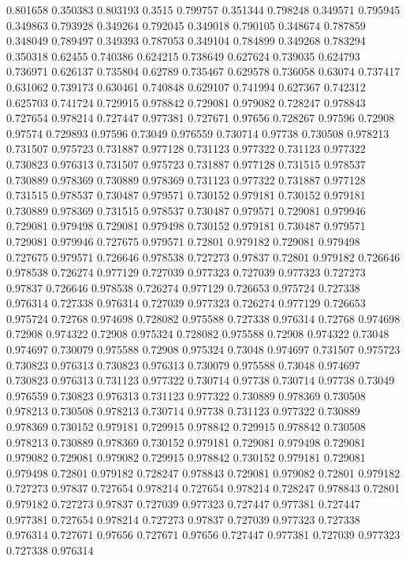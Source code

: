 0.801658 0.350383
0.803193 0.3515
0.799757 0.351344
0.798248 0.349571
0.795945 0.349863
0.793928 0.349264
0.792045 0.349018
0.790105 0.348674
0.787859 0.348049
0.789497 0.349393
0.787053 0.349104
0.784899 0.349268
0.783294 0.350318
0.62455 0.740386
0.624215 0.738649
0.627624 0.739035
0.624793 0.736971
0.626137 0.735804
0.62789 0.735467
0.629578 0.736058
0.63074 0.737417
0.631062 0.739173
0.630461 0.740848
0.629107 0.741994
0.627367 0.742312
0.625703 0.741724
0.729915 0.978842
0.729081 0.979082
0.728247 0.978843
0.727654 0.978214
0.727447 0.977381
0.727671 0.97656
0.728267 0.97596
0.72908 0.97574
0.729893 0.97596
0.73049 0.976559
0.730714 0.97738
0.730508 0.978213
0.731507 0.975723
0.731887 0.977128
0.731123 0.977322
0.731123 0.977322
0.730823 0.976313
0.731507 0.975723
0.731887 0.977128
0.731515 0.978537
0.730889 0.978369
0.730889 0.978369
0.731123 0.977322
0.731887 0.977128
0.731515 0.978537
0.730487 0.979571
0.730152 0.979181
0.730152 0.979181
0.730889 0.978369
0.731515 0.978537
0.730487 0.979571
0.729081 0.979946
0.729081 0.979498
0.729081 0.979498
0.730152 0.979181
0.730487 0.979571
0.729081 0.979946
0.727675 0.979571
0.72801 0.979182
0.729081 0.979498
0.727675 0.979571
0.726646 0.978538
0.727273 0.97837
0.72801 0.979182
0.726646 0.978538
0.726274 0.977129
0.727039 0.977323
0.727039 0.977323
0.727273 0.97837
0.726646 0.978538
0.726274 0.977129
0.726653 0.975724
0.727338 0.976314
0.727338 0.976314
0.727039 0.977323
0.726274 0.977129
0.726653 0.975724
0.72768 0.974698
0.728082 0.975588
0.727338 0.976314
0.72768 0.974698
0.72908 0.974322
0.72908 0.975324
0.728082 0.975588
0.72908 0.974322
0.73048 0.974697
0.730079 0.975588
0.72908 0.975324
0.73048 0.974697
0.731507 0.975723
0.730823 0.976313
0.730823 0.976313
0.730079 0.975588
0.73048 0.974697
0.730823 0.976313
0.731123 0.977322
0.730714 0.97738
0.730714 0.97738
0.73049 0.976559
0.730823 0.976313
0.731123 0.977322
0.730889 0.978369
0.730508 0.978213
0.730508 0.978213
0.730714 0.97738
0.731123 0.977322
0.730889 0.978369
0.730152 0.979181
0.729915 0.978842
0.729915 0.978842
0.730508 0.978213
0.730889 0.978369
0.730152 0.979181
0.729081 0.979498
0.729081 0.979082
0.729081 0.979082
0.729915 0.978842
0.730152 0.979181
0.729081 0.979498
0.72801 0.979182
0.728247 0.978843
0.729081 0.979082
0.72801 0.979182
0.727273 0.97837
0.727654 0.978214
0.727654 0.978214
0.728247 0.978843
0.72801 0.979182
0.727273 0.97837
0.727039 0.977323
0.727447 0.977381
0.727447 0.977381
0.727654 0.978214
0.727273 0.97837
0.727039 0.977323
0.727338 0.976314
0.727671 0.97656
0.727671 0.97656
0.727447 0.977381
0.727039 0.977323
0.727338 0.976314
